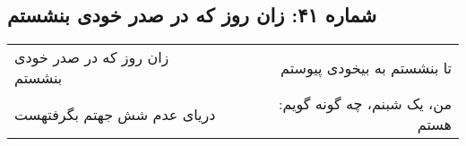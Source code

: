 \begin{center}
\section*{شماره ۴۱: زان روز که در صدر خودی بنشستم}
\label{sec:041}
\begin{longtable}{l p{0.5cm} r}
زان روز که در صدر خودی بنشستم
&&
تا بنشستم به بیخودی پیوستم
\\
دریای عدم شش جهتم بگرفتهست
&&
من، یک شبنم، چه گونه گویم: هستم
\\
\end{longtable}
\end{center}
